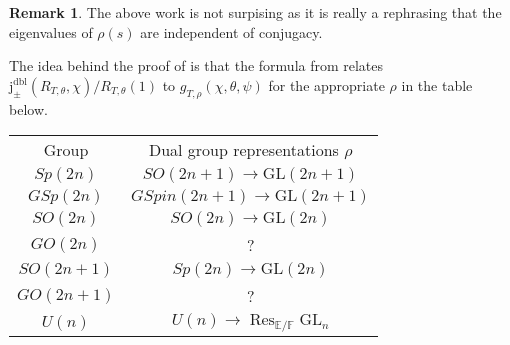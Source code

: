 \documentclass[12pt, reqno]{amsart}
\theoremstyle{definition}
\theoremstyle{definition}
\newtheorem{remark}[theorem]{Remark}
\theoremstyle{definition}
\newcommand{\GL}{\mathrm{GL}}
\newcommand{\aFieldNorm}{\mathrm{N}}
\newcommand{\finiteField}{\mathbb{F}}
\newcommand{\quadraticExtension}{\mathbb{E}}
\newcommand{\finiteFieldExtension}[1]{\finiteField_{#1}}
\newcommand{\NormOneGroup}[1]{\finiteFieldExtension{#1}^{\aFieldNorm = 1}}
\newcommand{\restrictionOfScalars}[3]{\operatorname{Res}_{#1 \slash #2}{#3}}
\newcommand{\dblVirtualJacobiSumScalar}[2]{\mathrm{j}_{\pm}^{\mathrm{dbl}}\left(#1, #2\right)}
\newcommand{\algebraicGroup}[1]{\boldsymbol{\mathrm{#1}}}
\begin{document}
\begin{remark}
	The above work is not surpising as it is really a rephrasing that the eigenvalues of $\rho(s)$ are independent of conjugacy.
\end{remark}

The idea behind the proof of  is that the formula from  relates $\dblVirtualJacobiSumScalar{R_{T, \theta}}{\chi}/R_{T,\theta}(1)$ to $g_{T,\rho}(\chi,\theta,\psi)$ for the appropriate $\rho$ in the table below. 
\begin{center}
\begin{tabular}{ c c}
 Group & Dual group representations $\rho$ \\ 
 $Sp(2n)$ &$SO(2n+1) \to \GL(2n+1)$\\  
 $GSp(2n)$  &$GSpin(2n+1) \to \GL(2n+1)$ \\
 $SO(2n)$ &$SO(2n) \to \GL(2n)$ \\
 $GO(2n)$ & ? \\
 $SO(2n+1)$ &$Sp(2n) \to \GL(2n)$ \\
 $GO(2n+1)$ & ? \\ 
  $U(n)$  & $U(n) \to \restrictionOfScalars{\quadraticExtension}{\finiteField}{\algebraicGroup{\GL}_n}$  
\end{tabular}
\end{center}


\end{document}

